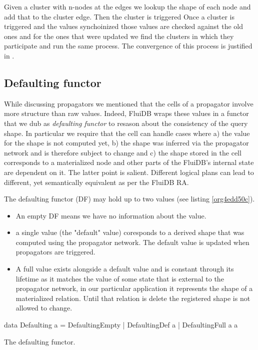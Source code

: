 Given a cluster with n-nodes at the edges we lookup the shape of each
node and add that to the cluster edge. Then the cluster is triggered
Once a cluster is triggered and the values synchoinized those values
are checked against the old ones and for the ones that were updated we
find the clusters in which they participate and run the same
process. The convergence of this process is justified in
\cite{kuperLVarsLatticebasedData2013}.


\subsection{Defaulting functor}
\label{sec:org1d77ea1}
While discussing propagators we mentioned that the cells of a
propagator involve more structure than raw values. Indeed, FluiDB
wraps these values in a functor that we dub as \emph{defaulting
  functor} to resason about the consistency of the query shape. In
particular we require that the cell can handle cases where a) the
value for the shape is not computed yet, b) the shape was inferred via
the propagator network and is therefore subject to change and c) the
shape stored in the cell corresponds to a materialized node and other
parts of the FluiDB's internal state are dependent on it. The latter
point is salient. Different logical plans can lead to different, yet
semantically equivalent as per the FluiDB RA.

The defaulting functor (DF) may hold up to two values (see listing
\ref{org4edd50c}).

\begin{itemize}
\item An empty DF means we have no information about the value.
\item a single value (the "default" value) coresponds to a derived shape
  that was computed using the propagator network. The default value is
  updated when propagators are triggered.
\item A full value exists alongside a default value and is constant
  through its lifetime as it matches the value of some state that is
  external to the propagator network, in our particular application it
  represents the shape of a materialized relation. Until that relation
  is delete the registered shape is not allowed to change.
\end{itemize}

\begin{code}
  \begin{haskellcode}
    data Defaulting a =
      DefaultingEmpty
      | DefaultingDef a
      | DefaultingFull a a
  \end{haskellcode}
  \caption{\label{org4edd50c}The defaulting functor.}
\end{code}

